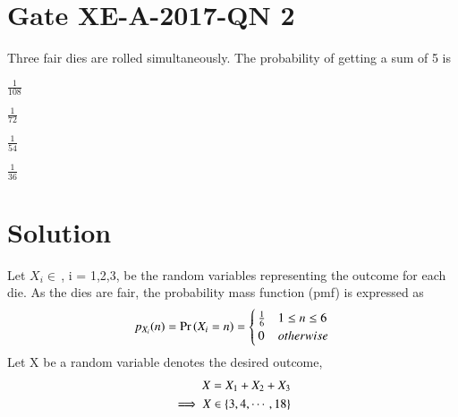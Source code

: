 \documentclass[journal,12pt,twocolumn]{IEEEtran}
\begin{document}
\section{Gate XE-A-2017-QN 2}
Three fair dies are rolled simultaneously. The probability of getting a sum of 5 is\\
\begin{inparaenum}[(A)]
    \item $\frac{1}{108}$\hspace{0.5cm}
    \item $\frac{1}{72}$\hspace{0.5cm}
    \item $\frac{1}{54}$\hspace{0.5cm}
    \item $\frac{1}{36}$
\end{inparaenum}

\section{Solution}
Let
$X_i\in\,$, i = 1,2,3, be the random variables representing the outcome for each die. As the dies are fair, the probability mass function (pmf) is expressed as
\begin{align}
    p_{X_i}(n) = \Pr\left(X_i = n\right) = 
\begin{cases}
\frac{1}{6} & 1 \le n \le 6
\\
0 & otherwise
\end{cases}\label{1}
\end{align}
Let X be a random variable denotes the desired outcome,
\begin{align}
    X=X_1+X_2+X_3\label{2}\\
    \implies X\in\left\{3,4,\cdots,18\right\}
\end{align}
\end{document}
